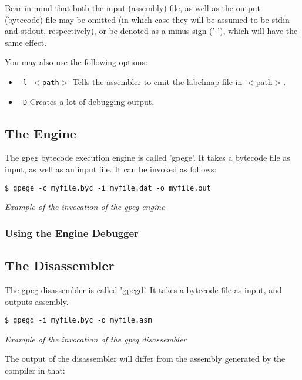 Bear in mind that both the input (assembly) file, as well as the
output (bytecode) file may be omitted (in which case they will be
assumed to be stdin and stdout, respectively), or be denoted as
a minus sign ('-'), which will have the same effect.

You may also use the following options:

\begin{itemize}
\item \texttt{-l $<$path$>$} Tells the assembler to emit the labelmap
      file in $<$path$>$.
\item \texttt{-D} Creates a lot of debugging output.
\end{itemize}

\subsection{The Engine}

The gpeg bytecode execution engine is called 'gpege'.
It takes a bytecode file as input, as well as an input file.
It can be invoked as follows:

\begin{myquote}
\begin{verbatim}
$ gpege -c myfile.byc -i myfile.dat -o myfile.out
\end{verbatim}
\end{myquote}
\textit{Example of the invocation of the gpeg engine}

\subsubsection{Using the Engine Debugger}

\subsection{The Disassembler}

The gpeg disassembler is called 'gpegd'.
It takes a bytecode file as input, and outputs assembly.

\begin{myquote}
\begin{verbatim}
$ gpegd -i myfile.byc -o myfile.asm
\end{verbatim}
\end{myquote}
\textit{Example of the invocation of the gpeg disassembler}

The output of the disassembler will differ from the assembly
generated by the compiler in that:

